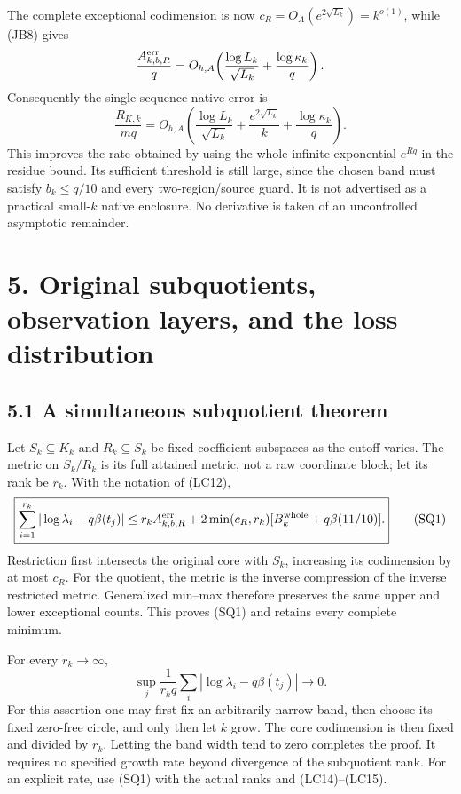\documentclass[10pt]{article}
\begin{document}
The complete exceptional codimension is now \(c_R=O_A(e^{2\sqrt{L_k}})=k^{o(1)}\), while (JB8) gives \[
 \frac{A_{k,b,R}^{\rm err}}q
 =O_{h,A}\!\left(\frac{\log L_k}{\sqrt{L_k}}
 +\frac{\log\kappa_k}{q}\right).
\] Consequently the single-sequence native error is \[
 \boxed{\frac{R_{K,k}}{mq}
 =O_{h,A}\!\left(
 \frac{\log L_k}{\sqrt{L_k}}
 +\frac{e^{2\sqrt{L_k}}}{k}
 +\frac{\log\kappa_k}{q}\right).}
 \tag{LC15}
\] This improves the rate obtained by using the whole infinite exponential \(e^{Rq}\) in the residue bound. Its sufficient threshold is still large, since the chosen band must satisfy \(b_k\le q/10\) and every two-region/source guard. It is not advertised as a practical small-\(k\) native enclosure. No derivative is taken of an uncontrolled asymptotic remainder.

\section{5. Original subquotients, observation layers, and the loss distribution}\label{original-subquotients-observation-layers-and-the-loss-distribution}

\subsection{5.1 A simultaneous subquotient theorem}\label{a-simultaneous-subquotient-theorem}

Let \(S_k\subseteq K_k\) and \(R_k\subseteq S_k\) be fixed coefficient subspaces as the cutoff varies. The metric on \(S_k/R_k\) is its full attained metric, not a raw coordinate block; let its rank be \(r_k\). With the notation of (LC12), \[
 \boxed{\sum_{i=1}^{r_k}|\log\lambda_i-q\beta(t_j)|
 \le r_kA_{k,b,R}^{\rm err}
 +2\min(c_R,r_k)[B_k^{\rm whole}+q\beta(11/10)].}
 \tag{SQ1}
\] Restriction first intersects the original core with \(S_k\), increasing its codimension by at most \(c_R\). For the quotient, the metric is the inverse compression of the inverse restricted metric. Generalized min--max therefore preserves the same upper and lower exceptional counts. This proves (SQ1) and retains every complete minimum.

For every \(r_k\to\infty\), \[
 \sup_j\frac1{r_kq}\sum_i|\log\lambda_i-q\beta(t_j)|\longrightarrow0.
 \tag{SQ2}
\] For this assertion one may first fix an arbitrarily narrow band, then choose its fixed zero-free circle, and only then let \(k\) grow. The core codimension is then fixed and divided by \(r_k\). Letting the band width tend to zero completes the proof. It requires no specified growth rate beyond divergence of the subquotient rank. For an explicit rate, use (SQ1) with the actual ranks and (LC14)--(LC15).
\end{document}

